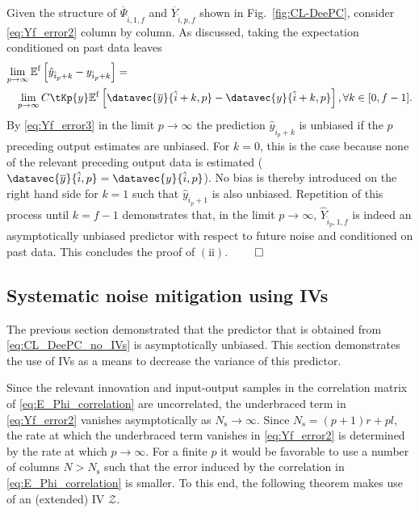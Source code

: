 Given the structure of $\overline{\Psi}_{\hat{i},1,f}$ and $\overline{Y}_{\hat{i},p,f}$ shown in Fig.~\ref{fig:CL-DeePC}, consider \eqref{eq:Yf_error2} column by column. As discussed, taking the expectation conditioned on past data leaves
\begin{align}\label{eq:Yf_error3}
\begin{split}
    &\mkern-3mu\lim_{p\rightarrow\infty} \mathbb{E}^\mathrm{f}\left[\hat{y}_{\hat{i}_p+k}-y_{\hat{i}_p+k}\right] = \\ &\;\;\;\lim_{p\rightarrow\infty}C\tKp{y}\mathbb{E}^\mathrm{f}\left[\datavec{\overline{y}}{\hat{i}+k,p}-\datavec{y}{\hat{i}+k,p}\right],\forall k\in[0,f-1].
\end{split}
\end{align}
By \eqref{eq:Yf_error3} in the limit $p\rightarrow\infty$ the prediction $\hat{y}_{\hat{i}_p+k}$ is unbiased if the $p$ preceding output estimates are unbiased. For $k=0$, this is the case because none of the relevant preceding output data is estimated ($\datavec{\overline{y}}{\hat{i},p}=\datavec{y}{\hat{i},p}$). No bias is thereby introduced on the right hand side for $k=1$ such that $\hat{y}_{\hat{i}_p+1}$ is also unbiased. Repetition of this process until $k=f-1$ demonstrates that, in the limit $p\rightarrow\infty$, $\widehat{Y}_{\hat{i}_p,1,f}$ is indeed an asymptotically unbiased predictor with respect to future noise and conditioned on past data. This concludes the proof of $\mathrm{(ii)}$. $\hfill\qed$

\subsection{Systematic noise mitigation using \ac{IVs}}
The previous section demonstrated that the predictor that is obtained from \eqref{eq:CL_DeePC_no_IVs} is asymptotically unbiased. This section demonstrates the use of \ac{IVs} as a means to decrease the variance of this predictor.

Since the relevant innovation and input-output samples in the correlation matrix of \eqref{eq:E_Phi_correlation} are uncorrelated, the underbraced term in \eqref{eq:Yf_error2} vanishes asymptotically as $N_\mathrm{s}\rightarrow\infty$. Since $N_\mathrm{s}=(p+1)r+pl$, the rate at which the underbraced term vanishes in \eqref{eq:Yf_error2} is determined by the rate at which $p\rightarrow\infty$. For a finite $p$ it would be favorable to use a number of columns $N>N_\mathrm{s}$ such that the error induced by the correlation in \eqref{eq:E_Phi_correlation} is smaller. To this end, the following theorem makes use of an (extended) \ac{IV} $\mathcal{Z}$.
% 

